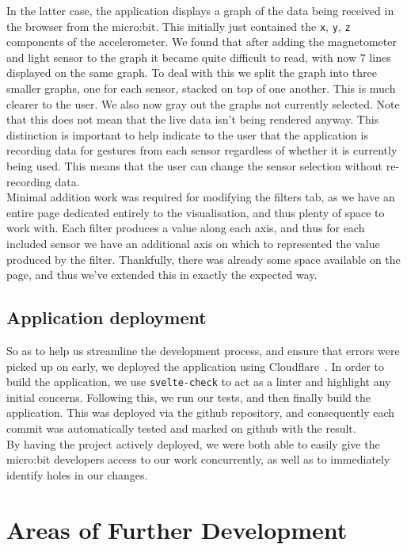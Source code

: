 \documentclass{article}
\begin{document}
In the latter case, the application displays a graph of the data being received in the browser from the micro:bit. This initially just contained the \verb|x|, \verb|y|, \verb|z| components of the accelerometer. We found that after adding the magnetometer and light sensor to the graph it became quite difficult to read, with now 7 lines displayed on the same graph. To deal with this we split the graph into three smaller graphs, one for each sensor, stacked on top of one another. This is much clearer to the user. We also now gray out the graphs not currently selected. Note that this does not mean that the live data isn't being rendered anyway. This distinction is important to help indicate to the user that the application is recording data for gestures from each sensor regardless of whether it is currently being used. This means that the user can change the sensor selection without re-recording data. \\

Minimal addition work was required for modifying the filters tab, as we have an entire page dedicated entirely to the visualisation, and thus plenty of space to work with. Each filter produces a value along each axis, and thus for each included sensor we have an additional axis on which to represented the value produced by the filter. Thankfully, there was already some space available on the page, and thus we've extended this in exactly the expected way.

\subsection{Application deployment}%
\label{subsec:deployment}

So as to help us streamline the development process, and ensure that errors were picked up on early, we deployed the application using Cloudflare~\cite{cloudflare}. In order to build the application, we use \verb|svelte-check| to act as a linter and highlight any initial concerns. Following this, we run our tests, and then finally build the application. This was deployed via the github repository, and consequently each commit was automatically tested and marked on github with the result. \\

By having the project actively deployed, we were both able to easily give the micro:bit developers access to our work concurrently, as well as to immediately identify holes in our changes.

\section{Areas of Further Development}%
\label{sec:development}
\end{document}
